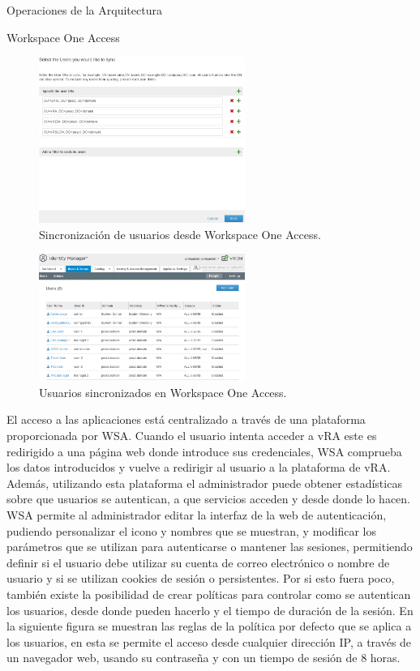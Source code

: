 \begin{subsection}{Operaciones de la Arquitectura}
\begin{subsubsection}{Workspace One Access}
        \begin{figure}[h]
            \centering
            \includegraphics[width=0.6\textwidth]{imaxes/pruebaconcepto/vrealize/syncing-users.png}
            \caption{Sincronización de usuarios desde Workspace One Access.}
            \label{fig:users-defined-WSA}
        \end{figure}
        \FloatBarrier
        \begin{figure}[h]
            \centering
            \includegraphics[width=0.6\textwidth]{imaxes/pruebaconcepto/vrealize/users-wsa.png}
            \caption{Usuarios sincronizados en Workspace One Access.}
            \label{fig:users-defined-WSA}
        \end{figure}
        \FloatBarrier
        El acceso a las aplicaciones está centralizado a través de una plataforma proporcionada por WSA. Cuando el usuario intenta acceder a vRA este es redirigido a una página web donde introduce sus credenciales, WSA comprueba los datos introducidos y vuelve a redirigir al usuario a la plataforma de vRA. Además, utilizando esta plataforma el administrador puede obtener estadísticas sobre que usuarios se autentican, a que servicios acceden y desde donde lo hacen. WSA permite al administrador editar la interfaz de la web de autenticación, pudiendo personalizar el icono y nombres que se muestran, y modificar los parámetros que se utilizan para autenticarse o mantener las sesiones, permitiendo definir si el usuario debe utilizar su cuenta de correo electrónico o nombre de usuario y si se utilizan cookies de sesión o persistentes. Por si esto fuera poco, también existe la posibilidad de crear políticas para controlar como se autentican los usuarios, desde donde pueden hacerlo y el tiempo de duración de la sesión. En la siguiente figura se muestran las reglas de la política por defecto que se aplica a los usuarios, en esta se permite el acceso desde cualquier dirección IP, a través de un navegador web, usando su contraseña y con un tiempo de sesión de 8 horas.

\end{subsubsection}
\end{subsection}
